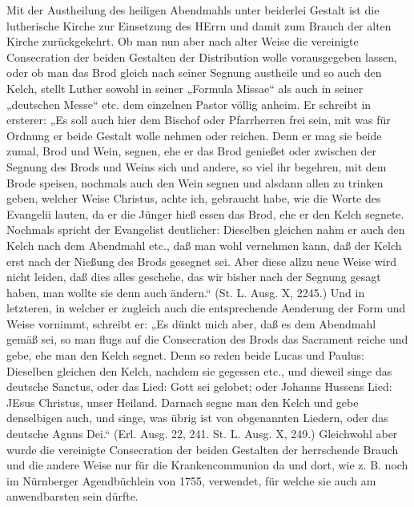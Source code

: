 Mit der Austheilung des heiligen Abendmahls unter beiderlei Gestalt ist die lutherische Kirche zur Einsetzung des HErrn und damit zum Brauch der alten Kirche zurückgekehrt. Ob man nun aber nach alter Weise die vereinigte
Consecration der beiden Gestalten der Distribution wolle vorausgegeben lassen, oder ob man das Brod gleich nach seiner Segnung austheile und so auch den Kelch, stellt Luther sowohl in seiner „Formula Missae“ als auch in seiner „deutschen Messe“ etc. dem einzelnen Pastor völlig anheim. Er schreibt in ersterer: „Es soll auch hier dem Bischof oder Pfarrherren frei sein, mit was für Ordnung er beide Gestalt wolle nehmen oder reichen. Denn er mag sie beide zumal, Brod und Wein, segnen, ehe er das Brod genießet oder zwischen der Segnung des Brods und Weins sich und andere, so viel ihr begehren, mit dem Brode speisen, nochmals auch den Wein segnen und alsdann allen zu trinken geben, welcher Weise Christus, achte ich, gebraucht habe, wie die Worte des Evangelii lauten, da er die Jünger hieß essen das Brod, ehe er den Kelch segnete. Nochmals spricht der Evangelist deutlicher: Dieselben gleichen nahm er auch den Kelch nach dem Abendmahl etc., daß man wohl vernehmen kann, daß der Kelch erst nach der Nießung des Brods gesegnet sei. Aber diese allzu neue Weise wird nicht leiden, daß dies alles geschehe, das wir bisher nach der Segnung gesagt haben, man wollte sie denn auch ändern.“ (St. L. Ausg. X, 2245.) Und in letzteren, in welcher er zugleich auch die entsprechende Aenderung der Form und Weise vornimmt, schreibt er: „Es dünkt mich aber, daß es dem Abendmahl gemäß sei, so man flugs auf die Consecration des Brods das Sacrament reiche und gebe, ehe man den Kelch segnet. Denn so reden beide Lucas und Paulus: Dieselben gleichen den Kelch, nachdem sie gegessen etc., und dieweil singe das deutsche Sanctus, oder das Lied: Gott sei gelobet; oder Johanns Hussens Lied: JEsus Christus, unser Heiland. Darnach segne man den Kelch und gebe denselbigen auch, und singe, was übrig ist von obgenannten Liedern, oder das deutsche Agnus Dei.“ (Erl. Ausg. 22, 241. St. L. Ausg. X, 249.) Gleichwohl aber wurde die vereinigte Consecration der beiden Gestalten der herrschende Brauch und die andere Weise nur für die Krankencommunion da und dort, wie z. B. noch im Nürnberger Agendbüchlein von 1755, verwendet, für welche sie auch am anwendbarsten sein dürfte.

